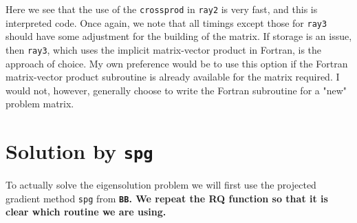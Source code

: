\documentclass[10pt]{article}\usepackage[]{graphicx}\usepackage[]{color}
\newcommand{\code}[1]{{\tt #1}}
\newcommand{\pkg}[1]{\bf{\tt #1}\rm }
\begin{document}
Here we see that the use of the \code{crossprod} in \code{ray2} is 
very fast, and this is interpreted code. Once again, we note that all 
timings except those for \code{ray3} should have some adjustment for
the building of the matrix. If storage is an issue, then \code{ray3},
which uses the implicit matrix-vector product in Fortran, is the 
approach of choice. My own preference would be to use this option
if the Fortran matrix-vector product subroutine is already available
for the matrix required. I would not, however, generally choose to
write the Fortran subroutine for a "new" problem matrix. 


\section{Solution by \code{spg}}

To actually solve the eigensolution problem we will first use the 
projected gradient method \code{spg} from \pkg{BB}. We repeat the 
RQ function so that it is clear which routine we are using.
\end{document}
